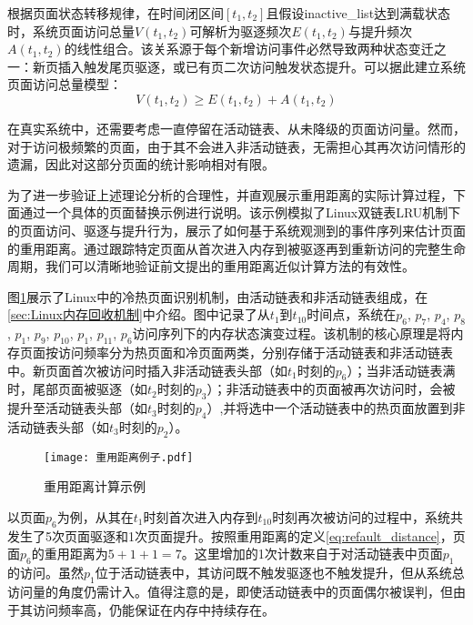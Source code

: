 根据页面状态转移规律，在时间闭区间$[t_1, t_2]$且假设inactive\_list达到满载状态时，系统页面访问总量$V(t_1, t_2)$可解析为驱逐频次$E(t_1, t_2)$与提升频次$A(t_1, t_2)$的线性组合。该关系源于每个新增访问事件必然导致两种状态变迁之一：新页插入触发尾页驱逐，或已有页二次访问触发状态提升。可以据此建立系统页面访问总量模型：
\[
V(t_1, t_2) \geq E(t_1,t_2) + A(t_1,t_2)
\]

在真实系统中，还需要考虑一直停留在活动链表、从未降级的页面访问量。然而，对于访问极频繁的页面，由于其不会进入非活动链表，无需担心其再次访问情形的遗漏，因此对这部分页面的统计影响相对有限。

为了进一步验证上述理论分析的合理性，并直观展示重用距离的实际计算过程，下面通过一个具体的页面替换示例进行说明。该示例模拟了Linux双链表LRU机制下的页面访问、驱逐与提升行为，展示了如何基于系统观测到的事件序列来估计页面的重用距离。通过跟踪特定页面从首次进入内存到被驱逐再到重新访问的完整生命周期，我们可以清晰地验证前文提出的重用距离近似计算方法的有效性。

图\ref{fig:page_replacement_example}展示了Linux中的冷热页面识别机制，由活动链表和非活动链表组成，在\ref{sec:Linux内存回收机制}中介绍。图中记录了从$t_1$到$t_{10}$时间点，系统在\(p_6\), \(p_7\), \(p_4\), \(p_8\), \(p_1\), \(p_9\), \(p_{10}\), \(p_1\), \(p_{11}\), \(p_6\)访问序列下的内存状态演变过程。该机制的核心原理是将内存页面按访问频率分为热页面和冷页面两类，分别存储于活动链表和非活动链表中。新页面首次被访问时插入非活动链表头部（如$t_1$时刻的\(p_6\)）；当非活动链表满时，尾部页面被驱逐（如\(t_2\)时刻的$p_3$）；非活动链表中的页面被再次访问时，会被提升至活动链表头部（如$t_3$时刻的$p_4$）,并将选中一个活动链表中的热页面放置到非活动链表头部（如$t_3$时刻的$p_2$）。

\begin{figure}[htbp]
  \centering
  \texttt{[image: 重用距离例子.pdf]}
  \caption{重用距离计算示例}
  \label{fig:page_replacement_example}
\end{figure}
以页面$p_6$为例，从其在$t_1$时刻首次进入内存到$t_{10}$时刻再次被访问的过程中，系统共发生了5次页面驱逐和1次页面提升。按照重用距离的定义\ref{eq:refault_distance}，页面$p_6$的重用距离为$5+1+1=7$。这里增加的1次计数来自于对活动链表中页面$p_1$的访问。虽然$p_1$位于活动链表中，其访问既不触发驱逐也不触发提升，但从系统总访问量的角度仍需计入。值得注意的是，即使活动链表中的页面偶尔被误判，但由于其访问频率高，仍能保证在内存中持续存在。

